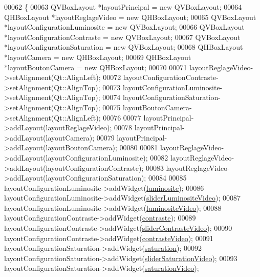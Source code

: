 \begin{DoxyCode}
00062 \{
00063     QVBoxLayout *layoutPrincipal = \textcolor{keyword}{new} QVBoxLayout;
00064     QHBoxLayout *layoutReglageVideo = \textcolor{keyword}{new} QHBoxLayout;
00065     QVBoxLayout *layoutConfigurationLuminosite = \textcolor{keyword}{new} QVBoxLayout;
00066     QVBoxLayout *layoutConfigurationContraste = \textcolor{keyword}{new} QVBoxLayout;
00067     QVBoxLayout *layoutConfigurationSaturation = \textcolor{keyword}{new} QVBoxLayout;
00068     QHBoxLayout *layoutCamera = \textcolor{keyword}{new} QHBoxLayout;
00069     QHBoxLayout *layoutBoutonCamera = \textcolor{keyword}{new} QHBoxLayout;
00070 
00071     layoutReglageVideo->setAlignment(Qt::AlignLeft);
00072     layoutConfigurationContraste->setAlignment(Qt::AlignTop);
00073     layoutConfigurationLuminosite->setAlignment(Qt::AlignTop);
00074     layoutConfigurationSaturation->setAlignment(Qt::AlignTop);
00075     layoutBoutonCamera->setAlignment(Qt::AlignLeft);
00076 
00077     layoutPrincipal->addLayout(layoutReglageVideo);
00078     layoutPrincipal->addLayout(layoutCamera);
00079     layoutPrincipal->addLayout(layoutBoutonCamera);
00080 
00081     layoutReglageVideo->addLayout(layoutConfigurationLuminosite);
00082     layoutReglageVideo->addLayout(layoutConfigurationContraste);
00083     layoutReglageVideo->addLayout(layoutConfigurationSaturation);
00084 
00085     layoutConfigurationLuminosite->addWidget(\hyperlink{class_i_h_m_reglage_video_a16b65877af48863d0752e226371952ab}{luminosite});
00086     layoutConfigurationLuminosite->addWidget(\hyperlink{class_i_h_m_reglage_video_a333b7f1b3239abd5823e0b0f2857716b}{sliderLuminositeVideo});
00087     layoutConfigurationLuminosite->addWidget(\hyperlink{class_i_h_m_reglage_video_a9109c0801d582917e78e57c350510ea7}{luminositeVideo});
00088     layoutConfigurationContraste->addWidget(\hyperlink{class_i_h_m_reglage_video_ad1aa173a98ced9f3aaeccb0c2712093c}{contraste});
00089     layoutConfigurationContraste->addWidget(\hyperlink{class_i_h_m_reglage_video_a69917b4179132a63efe6c3fb63ba666a}{sliderContrasteVideo});
00090     layoutConfigurationContraste->addWidget(\hyperlink{class_i_h_m_reglage_video_a617e9dbd5a92c35e7e351228354deb63}{contrasteVideo});
00091     layoutConfigurationSaturation->addWidget(\hyperlink{class_i_h_m_reglage_video_a452450793da1908cfe89fb9984b914d1}{saturation});
00092     layoutConfigurationSaturation->addWidget(\hyperlink{class_i_h_m_reglage_video_aba60de0eccec35f165101b10c0cd33df}{sliderSaturationVideo});
00093     layoutConfigurationSaturation->addWidget(\hyperlink{class_i_h_m_reglage_video_a058bd2a65aefa5f95ff73851f156064c}{saturationVideo});

\end{DoxyCode}

